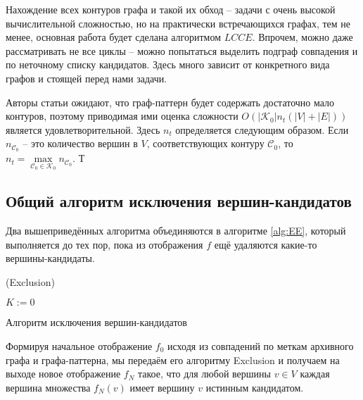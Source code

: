 Нахождение всех контуров графа и такой их обход -- задачи с очень высокой вычислительной сложностью, но на практически встречающихся графах, тем не менее, основная работа будет сделана алгоритмом $LCCE$. Впрочем, можно даже рассматривать не все циклы -- можно попытаться выделить подграф совпадения и по неточному списку кандидатов. Здесь много зависит от конкретного вида графов и стоящей перед нами задачи.

Авторы статьи \cite{patmat} ожидают, что граф-паттерн будет содержать достаточно мало контуров, поэтому приводимая ими оценка сложности $O(|\mathcal{K}_0|\allowbreak n_t \allowbreak (|V| + |E|))$ является удовлетворительной. Здесь $n_t$ определяется следующим образом. Если $n_{\mathcal{C}_0}$ -- это количество вершин в $V$, соответствующих контуру $\mathcal{C}_0$, то $n_t = \max\limits_{\mathcal{C}_0 \in \mathcal{K}_0} n_{\mathcal{C}_0}$. Т

\subsection{Общий алгоритм исключения вершин-кандидатов}

Два вышеприведённых алгоритма объединяются в алгоритме \ref{alg:EE}, который выполняется до тех пор, пока из отображения $f$ ещё удаляются какие-то вершины-кандидаты.

\begin{algorithm}[H]
	\Large
	\Begin(Exclusion){
		$K := 0$
		
	}

	\caption{Алгоритм исключения вершин-кандидатов}
	\label{alg:EE}
\end{algorithm}

Формируя начальное отображение $f_0$ исходя из совпадений по меткам архивного графа и графа-паттерна, мы передаём его алгоритму Exclusion и получаем на выходе новое отображение $f_N$ такое, что для любой вершины $v \in V$ каждая вершина множества $f_N(v)$ имеет вершину $v$ истинным кандидатом.

